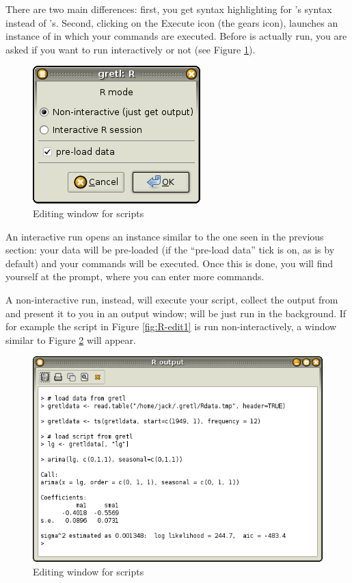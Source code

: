 There are two main differences: first, you get syntax highlighting for
's syntax instead of 's. Second, clicking on the
Execute icon (the gears icon), launches an instance of  in
which your commands are executed.  Before  is actually run, you
are asked if you want to run  interactively or not (see Figure
\ref{fig:R-exec-mode}).

\begin{figure}[htbp]
  \centering
  \includegraphics[scale=0.7]{figures/R-exec-mode}
  \caption{Editing window for  scripts}
  \label{fig:R-exec-mode}
\end{figure}

An interactive run opens an  instance similar to the one seen
in the previous section: your data will be pre-loaded (if the
``pre-load data'' tick is on, as is by default) and your commands will
be executed. Once this is done, you will find yourself at the 
prompt, where you can enter more commands.

A non-interactive run, instead, will execute your script, collect the
output from  and present it to you in an output window; 
will be just run in the background. If for example the script in
Figure \ref{fig:R-edit1} is run non-interactively, a window similar to
Figure \ref{fig:R-output1} will appear.

\begin{figure}[htbp]
  \centering
  \includegraphics[scale=0.7]{figures/R-output1}
  \caption{Editing window for  scripts}
  \label{fig:R-output1}
\end{figure}

